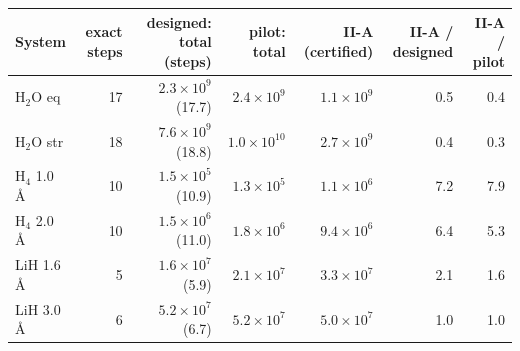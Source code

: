 \begin{tabular}{@{}lrrrrrr@{}}
\toprule
System & exact steps & designed: total (steps) & pilot: total & II-A (certified) & II-A / designed & II-A / pilot \\
\midrule
H$_2$O eq & 17 & $2.3\times10^{9}$ (17.7) & $2.4\times10^{9}$ & $1.1\times10^{9}$ & 0.5 & 0.4 \\
H$_2$O str & 18 & $7.6\times10^{9}$ (18.8) & $1.0\times10^{10}$ & $2.7\times10^{9}$ & 0.4 & 0.3 \\
H$_4$ 1.0 \AA & 10 & $1.5\times10^{5}$ (10.9) & $1.3\times10^{5}$ & $1.1\times10^{6}$ & 7.2 & 7.9 \\
H$_4$ 2.0 \AA & 10 & $1.5\times10^{6}$ (11.0) & $1.8\times10^{6}$ & $9.4\times10^{6}$ & 6.4 & 5.3 \\
LiH 1.6 \AA & 5 & $1.6\times10^{7}$ (5.9) & $2.1\times10^{7}$ & $3.3\times10^{7}$ & 2.1 & 1.6 \\
LiH 3.0 \AA & 6 & $5.2\times10^{7}$ (6.7) & $5.2\times10^{7}$ & $5.0\times10^{7}$ & 1.0 & 1.0 \\
\bottomrule
\end{tabular}
